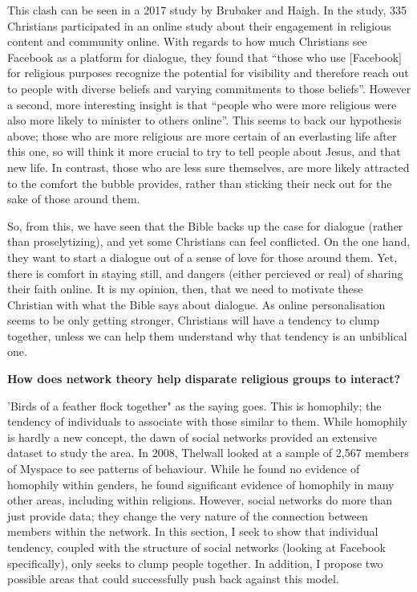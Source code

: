 \documentclass[]{article}
\begin{document}
This clash can be seen in a 2017 study by Brubaker and
Haigh\autocite{BrubakerReligiousFacebookExperience2017}. In the study,
335 Christians participated in an online study about their engagement in
religious content and community online. With regards to how much
Christians see Facebook as a platform for dialogue, they found that
``those who use {[}Facebook{]} for religious purposes recognize the
potential for visibility and therefore reach out to people with diverse
beliefs and varying commitments to those
beliefs''\autocite[pg 8]{BrubakerReligiousFacebookExperience2017}.
However a second, more interesting insight is that ``people who were
more religious were also more likely to minister to others
online''\autocite[pg 9]{BrubakerReligiousFacebookExperience2017}. This
seems to back our hypothesis above; those who are more religious are
more certain of an everlasting life after this one, so will think it
more crucial to try to tell people about Jesus, and that new life. In
contrast, those who are less sure themselves, are more likely attracted
to the comfort the bubble provides, rather than sticking their neck out
for the sake of those around them.

So, from this, we have seen that the Bible backs up the case for
dialogue (rather than proselytizing), and yet some Christians can feel
conflicted. On the one hand, they want to start a dialogue out of a
sense of love for those around them. Yet, there is comfort in staying
still, and dangers (either percieved or real) of sharing their faith
online. It is my opinion, then, that we need to motivate these Christian
with what the Bible says about dialogue. As online personalisation seems
to be only getting stronger, Christians will have a tendency to clump
together, unless we can help them understand why that tendency is an
unbiblical one.

\newpage 

\textbf{How does network theory help disparate religious groups to
interact?}

'Birds of a feather flock together" as the saying goes. This is
homophily; the tendency of individuals to associate with those similar
to them. While homophily is hardly a new concept, the dawn of social
networks provided an extensive dataset to study the area. In 2008,
Thelwall looked at a sample of 2,567 members of Myspace to see patterns
of behaviour\autocite{ThelwallHomophilyMySpace2009}. While he found no
evidence of homophily within genders, he found significant evidence of
homophily in many other areas, including within
religions\autocite[pg 229]{ThelwallHomophilyMySpace2009}. However,
social networks do more than just provide data; they change the very
nature of the connection between members within the network. In this
section, I seek to show that individual tendency, coupled with the
structure of social networks (looking at Facebook specifically), only
seeks to clump people together. In addition, I propose two possible
areas that could successfully push back against this model.
\end{document}
